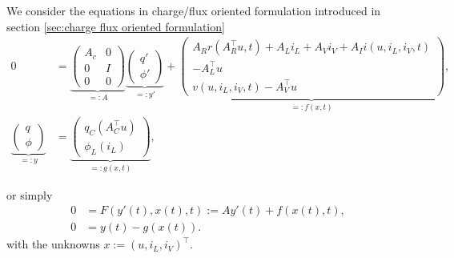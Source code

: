 We consider the equations in charge/flux oriented formulation introduced in section \ref{sec:charge flux oriented formulation}
\begin{align*}
	0 &=
	\underbrace{ 
	\left( \begin{matrix}
		A_c & 0 \\
		0 & I \\
		0 & 0
	\end{matrix} \right)}_{=:A}
	\underbrace{
	\left( \begin{matrix}
		q' \\
		\phi'
	\end{matrix} \right)}_{=:y'}
	+
	\underbrace{
	\left( \begin{matrix}
		A_R r(A_R^\top u,t) + A_L i_L + A_V i_V + A_I i(u, i_L, i_V, t) \\
		- A_L^\top u \\
		v(u, i_L, i_V, t) - A_V^\top u
	\end{matrix} \right)}_{=:f(x,t)}, \\
	\underbrace{
	\left( \begin{matrix}
		q \\
		\phi 
	\end{matrix} \right)}_{=:y} 
	&=
	\underbrace{
	\left( \begin{matrix}
		q_C(A_C^\top u) \\
		\phi_L(i_L) 
	\end{matrix} \right)}_{=:g(x,t)},
\end{align*}

or simply
\begin{align*}
	0 &= F(y'(t), x(t), t) :=A y'(t) + f(x(t),t), \\
	0 &= y(t) - g(x(t)).
\end{align*}
with the unknowns $x:=(u, i_L, i_V)^\top$.

